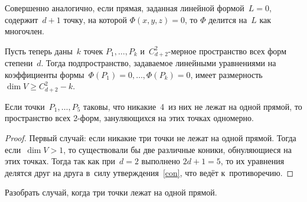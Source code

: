 \documentclass{article}
\begin{document}
\begin{remark}
  Совершенно аналогично, если прямая, заданная линейной формой~$L = 0$,
  содержит~$d + 1$ точку, на которой $\Phi(x, y, z) = 0$, то $\Phi$ делится
  на~$L$ как многочлен.
\end{remark}

Пусть теперь даны~$k$ точек $P_1, \ldots, P_k$ и~$C_{d+2}^2$-мерное пространство
всех форм степени~$d$. Тогда подпространство, задаваемое линейными уравнениями
на коэффициенты формы~$\Phi(P_1) = 0, \ldots, \Phi(P_k) = 0$, имеет
размерность~$\dim V \ge C_{d+2}^2 - k$.

\begin{claim}
  Если точки~$P_1, \ldots, P_5$ таковы, что никакие~4~из них не лежат на одной
  прямой, то пространство всех 2-форм, зануляющихся на этих точках одномерно.
\end{claim}
\begin{proof}
  Первый случай: если никакие три точки не лежат на одной прямой. Тогда
  если~$\dim V > 1$, то существовали бы две различные коники, обнуляющиеся на
  этих точках. Тогда так как при~$d = 2$ выполнено $2d + 1 = 5$, то их уравнения
  делятся друг на друга в~силу утверждения~\ref{con}, что ведёт к~противоречию.
\end{proof}

\begin{exercise}
  Разобрать случай, когда три точки лежат на одной прямой.
\end{exercise}
\end{document}
